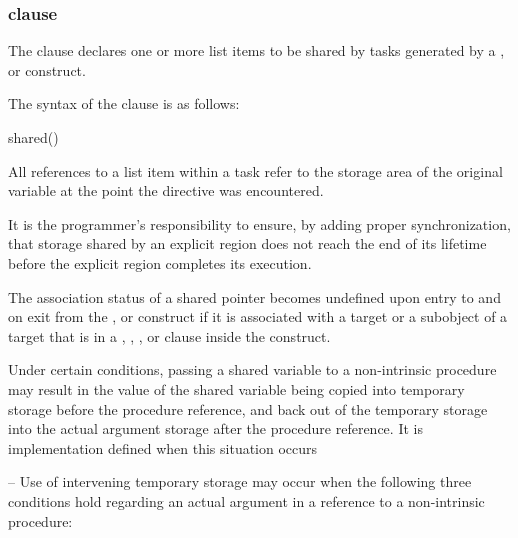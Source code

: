 \subsubsection{ clause}
\label{subsubsec:shared clause}
\summary
The  clause declares one or more list items to be shared by tasks generated by 
a ,  or  construct. 

\syntax
The syntax of the  clause is as follows:

\begin{boxedcode}
shared()
\end{boxedcode}

\descr
All references to a list item within a task refer to the storage area of the original variable 
at the point the directive was encountered. 

It is the programmer's responsibility to ensure, by adding proper synchronization, that 
storage shared by an explicit  region does not reach the end of its lifetime before 
the explicit  region completes its execution. 

\fortranspecificstart
The association status of a shared pointer becomes undefined upon entry to and on exit 
from the ,  or  construct if it is associated with a target or a 
subobject of a target that is in a , , , or 
 clause inside the construct.

Under certain conditions, passing a shared variable to a non-intrinsic procedure may 
result in the value of the shared variable being copied into temporary storage before the 
procedure reference, and back out of the temporary storage into the actual argument 
storage after the procedure reference. It is implementation defined when this situation 
occurs

\notestart
\noteheader – Use of intervening temporary storage may occur when the following three 
conditions hold regarding an actual argument in a reference to a non-intrinsic procedure:

